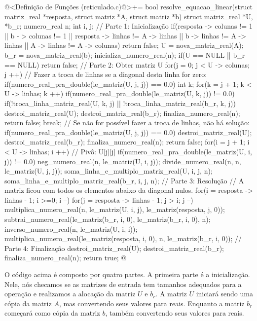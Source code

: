 \iniciocodigo
@<Definição de Funções (reticulado.c)@>+=
bool resolve_equacao_linear(struct matriz_real *resposta,
                           struct matriz *A, struct matriz *b){
  struct matriz_real *U, *b_r;
  numero_real n;
  int i, j;
  // Parte 1: Inicialização
  if(resposta -> colunas != 1 || b - > colunas != 1 ||
     resposta -> linhas != A -> linhas || b -> linhas != A -> linhas ||
     A -> linhas != A -> colunas)
    return false;
  U = nova_matriz_real(A);
  b_r = nova_matriz_real(b);
  inicializa_numero_real(n);
  if(U == NULL || b_r == NULL)
    return false;
  // Parte 2: Obter matriz U
  for(j = 0; j < U -> colunas; j ++){
    // Fazer a troca de linhas se a diagonal desta linha for zero:
    if(numero_real_pra_double(le_matriz(U, j, j)) == 0.0){
      int k;
      for(k = j + 1; k < U -> linhas; k ++){
        if(numero_real_pra_double(le_matriz(U, k, j)) != 0.0){
          if(!troca_linha_matriz_real(U, k, j) ||
             !troca_linha_matriz_real(b_r, k, j)){
            destroi_matriz_real(U);
            destroi_matriz_real(b_r);
            finaliza_numero_real(n);
            return false;
          }
          break;
        }
        // Se não for possível fazer a troca de linhas, não há solução:
        if(numero_real_pra_double(le_matriz(U, j, j)) == 0.0){
          destroi_matriz_real(U);
          destroi_matriz_real(b_r);
          finaliza_numero_real(n);
          return false;
        }
      }
    }
    for(i = j + 1; i < U -> linhas; i ++){
      // Pivô: U[j][j]
      if(numero_real_pra_double(le_matriz(U, i, j)) != 0.0){
        neg_numero_real(n, le_matriz(U, i, j));
        divide_numero_real(n, n, le_matriz(U, j, j));
        soma_linha_e_multiplo_matriz_real(U, i, j, n);
        soma_linha_e_multiplo_matriz_real(b_r, i, j, n);
      }
    }
  }
  // Parte 3: Resolução
  // A matriz ficou com todos os elementos abaixo da diagonal nulos.
  for(i = resposta -> linhas - 1; i >=0; i --){
    for(j = resposta -> linhas - 1; j > i; j --){
      multiplica_numero_real(n, le_matriz(U, i, j),
                             le_matriz(resposta, j, 0));
      subtrai_numero_real(le_matriz(b_r, i, 0), le_matriz(b_r, i, 0), n);
    }
    inverso_numero_real(n, le_matriz(U, i, i));
    multiplica_numero_real(le_matriz(resposta, i, 0), n,
                           le_matriz(b_r, i, 0));
  }
  // Parte 4: Finalização
  destroi_matriz_real(U);
  destroi_matriz_real(b_r);
  finaliza_numero_real(n);
  return true;
}
@
\fimcodigo

O código acima é composto por quatro partes. A primeira parte é a
inicialização. Nele, nós checamos se as matrizes de entrada tem
tamanhos adequados para a operação e realizamos a alocação da matriz
$U$ e $b_r$. A matriz $U$ iniciará sendo uma cópia da matriz $A$, mas
convertendo seus valores para reais. Enquanto a matriz $b_r$ começará
como cópia da matriz $b$, também convertendo seus valores para
reais.

